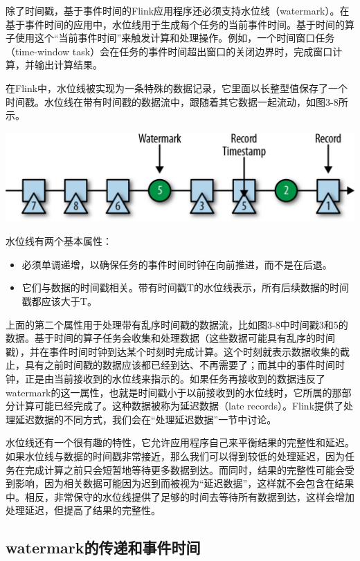 \documentclass[cn,11pt,chinese]{elegantbook}
\providecommand{\tightlist}{%
  \setlength{\itemsep}{0pt}\setlength{\parskip}{0pt}}
\begin{document}
除了时间戳，基于事件时间的Flink应用程序还必须支持水位线（watermark）。在基于事件时间的应用中，水位线用于生成每个任务的当前事件时间。基于时间的算子使用这个``当前事件时间''来触发计算和处理操作。例如，一个时间窗口任务（time-window
task）会在任务的事件时间超出窗口的关闭边界时，完成窗口计算，并输出计算结果。

在Flink中，水位线被实现为一条特殊的数据记录，它里面以长整型值保存了一个时间戳。水位线在带有时间戳的数据流中，跟随着其它数据一起流动，如图3-8所示。

\includegraphics{images/spaf_0308.png}

水位线有两个基本属性：

\begin{itemize}
\tightlist
\item
  必须单调递增，以确保任务的事件时间时钟在向前推进，而不是在后退。
\item
  它们与数据的时间戳相关。带有时间戳T的水位线表示，所有后续数据的时间戳都应该大于T。
\end{itemize}

上面的第二个属性用于处理带有乱序时间戳的数据流，比如图3-8中时间戳3和5的数据。基于时间的算子任务会收集和处理数据（这些数据可能具有乱序的时间戳），并在事件时间时钟到达某个时刻时完成计算。这个时刻就表示数据收集的截止，具有之前时间戳的数据应该都已经到达、不再需要了；而其中的事件时间时钟，正是由当前接收到的水位线来指示的。如果任务再接收到的数据违反了watermark的这一属性，也就是时间戳小于以前接收到的水位线时，它所属的那部分计算可能已经完成了。这种数据被称为延迟数据（late
records）。Flink提供了处理延迟数据的不同方式，我们会在``处理延迟数据''一节中讨论。

水位线还有一个很有趣的特性，它允许应用程序自己来平衡结果的完整性和延迟。如果水位线与数据的时间戳非常接近，那么我们可以得到较低的处理延迟，因为任务在完成计算之前只会短暂地等待更多数据到达。而同时，结果的完整性可能会受到影响，因为相关数据可能因为迟到而被视为``延迟数据''，这样就不会包含在结果中。相反，非常保守的水位线提供了足够的时间去等待所有数据到达，这样会增加处理延迟，但提高了结果的完整性。

\hypertarget{watermarkux7684ux4f20ux9012ux548cux4e8bux4ef6ux65f6ux95f4}{%
\subsection{watermark的传递和事件时间}\label{watermarkux7684ux4f20ux9012ux548cux4e8bux4ef6ux65f6ux95f4}}
\end{document}
